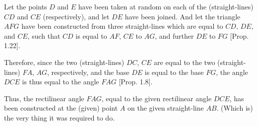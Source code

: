 \begin{Parallel}{}{}
{Let the points $D$ and $E$ have been taken at random on each
of the (straight-lines) $CD$ and $CE$ (respectively), and let $DE$ have been joined.
And let the triangle $AFG$ have been constructed from three straight-lines
which are equal to $CD$, $DE$, and $CE$, such that $CD$ is equal to $AF$,
$CE$ to $AG$, and further $DE$ to $FG$ [Prop. 1.22].

Therefore, since the two (straight-lines) $DC$, $CE$ are equal to the
two (straight-lines) $FA$, $AG$, respectively, and the base $DE$ is equal to
the base $FG$, the angle $DCE$ is thus equal to the angle $FAG$ [Prop. 1.8].

Thus, the rectilinear angle $FAG$,  equal to the  given
rectilinear angle $DCE$, has been constructed at the (given) point $A$ on the given straight-line $AB$.
(Which is) the very thing it was required to do.}
\end{Parallel}

